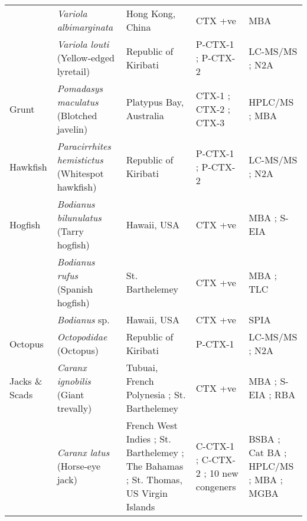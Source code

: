 \documentclass[12pt]{article}
\begin{document}
\begin{longtable}[l]{ | p{2cm} | p{3cm} | p{4.5cm} | p{2cm} | p{3cm} | }
	& \emph{Variola albimarginata} & Hong Kong, China \cite{wong2008features} & CTX +ve \cite{wong2008features} & MBA \cite{wong2008features} \\
	& \emph{Variola louti} (Yellow-edged lyretail) & Republic of Kiribati \cite{mak2013pacific} & P-CTX-1 \cite{mak2013pacific}; P-CTX-2 \cite{mak2013pacific} & LC-MS/MS \cite{mak2013pacific}; N2A \cite{mak2013pacific} \\
	\hline
	Grunt & \emph{Pomadasys maculatus} (Blotched javelin) & Platypus Bay, Australia \cite{lewis1992multiple} & CTX-1 \cite{lewis1992multiple}; CTX-2 \cite{lewis1992multiple}; CTX-3 \cite{lewis1992multiple} & HPLC/MS \cite{lewis1992multiple}; MBA \cite{lewis1992multiple} \\
	\hline
	Hawkfish & \emph{Paracirrhites hemistictus} (Whitespot hawkfish) & Republic of Kiribati \cite{mak2013pacific} & P-CTX-1 \cite{mak2013pacific}; P-CTX-2 \cite{mak2013pacific} & LC-MS/MS \cite{mak2013pacific}; N2A \cite{mak2013pacific} \\
	\hline
	Hogfish & \emph{Bodianus bilunulatus} (Tarry hogfish) & Hawaii, USA \cite{hokama1993evaluation} & CTX +ve \cite{hokama1993evaluation} & MBA \cite{hokama1993evaluation}; S-EIA \cite{hokama1993evaluation} \\
	& \emph{Bodianus rufus} (Spanish hogfish) & St. Barthelemey \cite{vernoux1986heterogeneity} & CTX +ve \cite{vernoux1986heterogeneity} & MBA \cite{vernoux1986heterogeneity}; TLC \cite{vernoux1986heterogeneity} \\
	& \emph{Bodianus} sp. & Hawaii, USA \cite{hokama1990simplified} & CTX +ve \cite{hokama1990simplified} & SPIA \cite{hokama1990simplified}\\
	\hline
Octopus & \emph{Octopodidae} (Octopus) & Republic of Kiribati \cite{mak2013pacific} & P-CTX-1 \cite{mak2013pacific} & LC-MS/MS \cite{mak2013pacific}; N2A \cite{mak2013pacific} \\
\hline
	Jacks \& Scads & \emph{Caranx ignobilis} (Giant trevally) & Tubuai, French Polynesia \cite{darius2007ciguatera}; St. Barthelemey \cite{vernoux1986heterogeneity} & CTX +ve \cite{hokama1993evaluation,darius2007ciguatera} & MBA \cite{hokama1993evaluation}; S-EIA \cite{hokama1993evaluation}; RBA \cite{darius2007ciguatera} \\
	& \emph{Caranx latus} (Horse-eye jack) & French West Indies \cite{pottier2002characterisation}; St. Barthelemey \cite{vernoux1997isolation,lewis1998structure}; The Bahamas \cite{larson1967ciguatera}; St. Thomas, US Virgin Islands \cite{granade1976ciguatera} & C-CTX-1 \cite{pottier2002characterisation,vernoux1997isolation,lewis1998structure}; C-CTX-2 \cite{vernoux1997isolation,pottier2002characterisation,lewis1998structure}; 10 new congeners \cite{pottier2002characterisation} & BSBA \cite{granade1976ciguatera}; Cat BA \cite{larson1967ciguatera}; HPLC/MS \cite{pottier2002characterisation,vernoux1997isolation,lewis1998structure}; MBA \cite{pottier2002characterisation,vernoux1997isolation} ; MGBA \cite{granade1976ciguatera}\\

\end{longtable}
\end{document}
